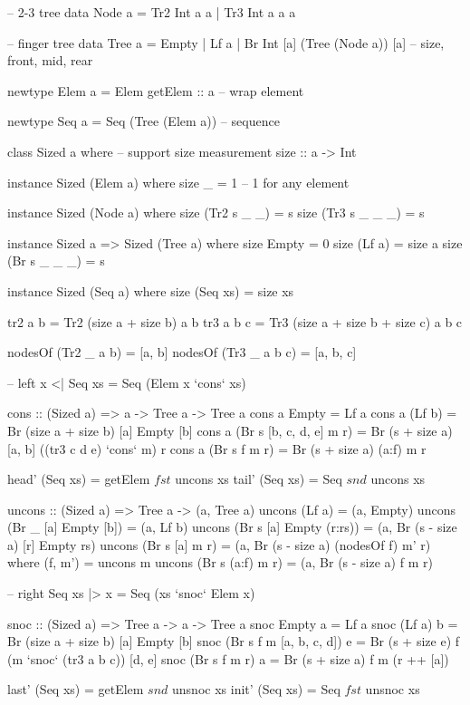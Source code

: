 \documentclass[b5paper]{article}
\begin{document}
\begin{Haskell}
-- 2-3 tree
data Node a = Tr2 Int a a
            | Tr3 Int a a a

-- finger tree
data Tree a = Empty
            | Lf a
            | Br Int [a] (Tree (Node a)) [a] -- size, front, mid, rear

newtype Elem a = Elem { getElem :: a } -- wrap element

newtype Seq a = Seq (Tree (Elem a)) -- sequence

class Sized a where  -- support size measurement
  size :: a -> Int

instance Sized (Elem a) where
  size _ = 1  -- 1 for any element

instance Sized (Node a) where
  size (Tr2 s _ _) = s
  size (Tr3 s _ _ _) = s

instance Sized a => Sized (Tree a) where
  size Empty = 0
  size (Lf a) = size a
  size (Br s _ _ _) = s

instance Sized (Seq a) where
  size (Seq xs) = size xs

tr2 a b = Tr2 (size a + size b) a b
tr3 a b c = Tr3 (size a + size b + size c) a b c

nodesOf (Tr2 _ a b) = [a, b]
nodesOf (Tr3 _ a b c) = [a, b, c]

-- left
x <| Seq xs = Seq (Elem x `cons` xs)

cons :: (Sized a) => a -> Tree a -> Tree a
cons a Empty = Lf a
cons a (Lf b) = Br (size a + size b) [a] Empty [b]
cons a (Br s [b, c, d, e] m r) = Br (s + size a) [a, b] ((tr3 c d e) `cons` m) r
cons a (Br s f m r) = Br (s + size a) (a:f) m r

head' (Seq xs) = getElem $ fst $ uncons xs
tail' (Seq xs) = Seq $ snd $ uncons xs

uncons :: (Sized a) => Tree a -> (a, Tree a)
uncons (Lf a) = (a, Empty)
uncons (Br _ [a] Empty [b]) = (a, Lf b)
uncons (Br s [a] Empty (r:rs)) = (a, Br (s - size a) [r] Empty rs)
uncons (Br s [a] m r) = (a, Br (s - size a) (nodesOf f) m' r)
    where (f, m') = uncons m
uncons (Br s (a:f) m r) = (a, Br (s - size a) f m r)

-- right
Seq xs |> x  = Seq (xs `snoc` Elem x)

snoc :: (Sized a) => Tree a -> a -> Tree a
snoc Empty a = Lf a
snoc (Lf a) b = Br (size a + size b) [a] Empty [b]
snoc (Br s f m [a, b, c, d]) e = Br (s + size e) f (m `snoc` (tr3 a b c)) [d, e]
snoc (Br s f m r) a = Br (s + size a) f m (r ++ [a])

last' (Seq xs) = getElem $ snd $ unsnoc xs
init' (Seq xs) = Seq $ fst $ unsnoc xs


\end{Haskell}
\end{document}
